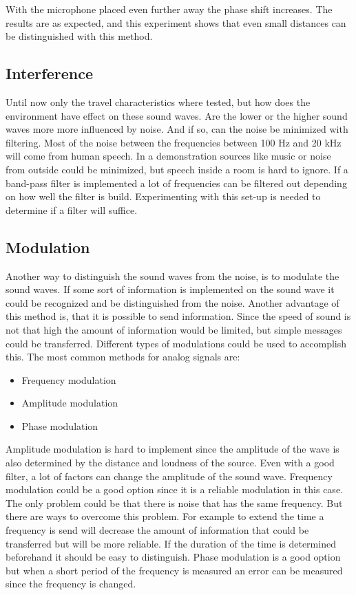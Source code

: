 \documentclass[10pt,a4paper]{article}
\begin{document}
With the microphone placed even further away the phase shift increases. The results are as expected, and this experiment shows that even small distances can be distinguished with this method.

\subsection{Interference}

Until now only the travel characteristics where tested, but how does the environment have effect on these sound waves. Are the lower or the higher sound waves more more influenced by noise. And if so, can the noise be minimized with filtering. Most of the noise between the frequencies between 100 Hz and 20 kHz will come from human speech. In a demonstration sources like music or noise from outside could be minimized, but speech inside a room is hard to ignore. If a band-pass filter is implemented a lot of frequencies can be filtered out depending on how well the filter is build. Experimenting with this set-up is needed to determine if a filter will suffice.

\subsection{Modulation}

Another way to distinguish the sound waves from the noise, is to modulate the sound waves. If some sort of information is implemented on the sound wave it could be recognized and be distinguished from the noise. Another advantage of this method is, that it is possible to send information. Since the speed of sound is not that high the amount of information would be limited, but simple messages could be transferred. Different types of modulations could be used to accomplish this. The most common methods for analog signals are:  

\begin{itemize}
\item Frequency modulation
\item Amplitude modulation
\item Phase modulation
\end{itemize}

Amplitude modulation is hard to implement since the amplitude of the wave is also determined by the distance and loudness of the source. Even with a good filter, a lot of factors can change the amplitude of the sound wave. Frequency modulation could be a good option since it is a reliable modulation in this case. The only problem could be that there is noise that has the same frequency. But there are ways to overcome this problem. For example to extend the time a frequency is send will decrease the amount of information that could be transferred but will be more reliable. If the duration of the time is determined beforehand it should be easy to distinguish. Phase modulation is a good option but when a short period of the frequency is measured an error can be measured since the frequency is changed. 
\end{document}
